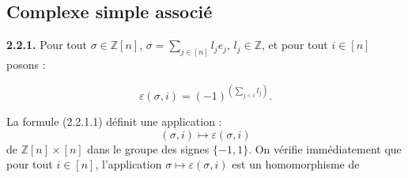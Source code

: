 \subsection{Complexe simple associé}

\noindent\textbf{2.2.1.}\quad
Pour tout $\sigma\in\mathbb Z[n]$,
$\sigma=\sum_{j\in[n]}l_je_j$, $l_j\in\mathbb Z$, et pour tout $i\in[n]$
posons :

\begin{equation}
  \varepsilon(\sigma,i)=(-1)^{\left(\sum_{j<i}l_j\right)}.
  \tag{2.2.1.1}
\end{equation}

La formule (2.2.1.1) définit une application :
\begin{equation*}
  (\sigma,i)\longmapsto\varepsilon(\sigma,i)
\end{equation*}
de $\mathbb Z[n]\times[n]$ dans le groupe des signes $\{-1,1\}$. On vérifie
immédiatement que pour tout $i\in[n]$, l'application
$\sigma\longmapsto\varepsilon(\sigma,i)$ est un homomorphisme de
